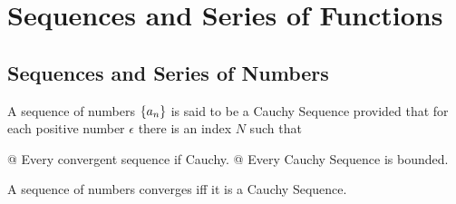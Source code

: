 \section{Sequences and Series of Functions}
    \subsection{Sequences and Series of Numbers}

    \begin{definition}
        A sequence of numbers ${\left\{ a_n \right\}}$ is said to be a Cauchy Sequence provided that for each positive number
        $\epsilon$ there is an index $N$ such that
        \begin{easylist}[enumerate]
            @ Every convergent sequence if Cauchy.
            @ Every Cauchy Sequence is bounded.
        \end{easylist}
    \end{definition}

    \begin{thm}
        A sequence of numbers converges iff it is a Cauchy Sequence.
    \end{thm}

